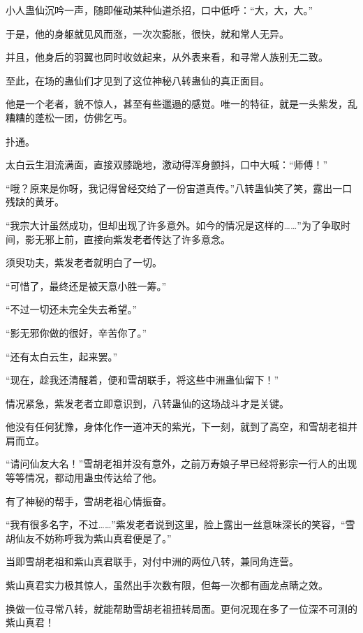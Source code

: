 
\begin{this_body}



小人蛊仙沉吟一声，随即催动某种仙道杀招，口中低呼：“大，大，大。”

于是，他的身躯就见风而涨，一次次膨胀，很快，就和常人无异。

并且，他身后的羽翼也同时收敛起来，从外表来看，和寻常人族别无二致。

至此，在场的蛊仙们才见到了这位神秘八转蛊仙的真正面目。

他是一个老者，貌不惊人，甚至有些邋遢的感觉。唯一的特征，就是一头紫发，乱糟糟的蓬松一团，仿佛乞丐。

扑通。

太白云生泪流满面，直接双膝跪地，激动得浑身颤抖，口中大喊：“师傅！”

“哦？原来是你呀，我记得曾经交给了一份宙道真传。”八转蛊仙笑了笑，露出一口残缺的黄牙。

“我宗大计虽然成功，但却出现了许多意外。如今的情况是这样的……”为了争取时间，影无邪上前，直接向紫发老者传达了许多意念。

须臾功夫，紫发老者就明白了一切。

“可惜了，最终还是被天意小胜一筹。”

“不过一切还未完全失去希望。”

“影无邪你做的很好，辛苦你了。”

“还有太白云生，起来罢。”

“现在，趁我还清醒着，便和雪胡联手，将这些中洲蛊仙留下！”

情况紧急，紫发老者立即意识到，八转蛊仙的这场战斗才是关键。

他没有任何犹豫，身体化作一道冲天的紫光，下一刻，就到了高空，和雪胡老祖并肩而立。

“请问仙友大名！”雪胡老祖并没有意外，之前万寿娘子早已经将影宗一行人的出现等等情况，都动用蛊虫传达给了他。

有了神秘的帮手，雪胡老祖心情振奋。

“我有很多名字，不过……”紫发老者说到这里，脸上露出一丝意味深长的笑容，“雪胡仙友不妨称呼我为紫山真君便是了。”

当即雪胡老祖和紫山真君联手，对付中洲的两位八转，兼同角连营。

紫山真君实力极其惊人，虽然出手次数有限，但每一次都有画龙点睛之效。

换做一位寻常八转，就能帮助雪胡老祖扭转局面。更何况现在多了一位深不可测的紫山真君！


\end{this_body}
